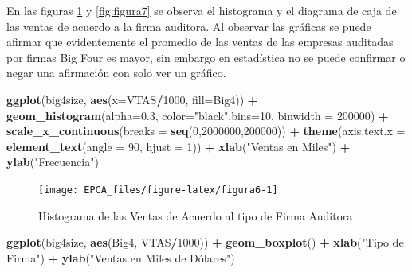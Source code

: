 \documentclass[
]{krantz}
\makeatletter
\newenvironment{Shaded}{\begin{snugshade}}{\end{snugshade}}
\newcommand{\DataTypeTok}[1]{\textcolor[rgb]{0.27,0.27,0.27}{#1}}
\newcommand{\DecValTok}[1]{\textcolor[rgb]{0.06,0.06,0.06}{#1}}
\newcommand{\FloatTok}[1]{\textcolor[rgb]{0.06,0.06,0.06}{#1}}
\newcommand{\KeywordTok}[1]{\textcolor[rgb]{0.27,0.27,0.27}{\textbf{#1}}}
\newcommand{\NormalTok}[1]{#1}
\newcommand{\OperatorTok}[1]{\textcolor[rgb]{0.43,0.43,0.43}{\textbf{#1}}}
\newcommand{\StringTok}[1]{\textcolor[rgb]{0.5,0.5,0.5}{#1}}
\newenvironment{kframe}{%
\medskip{}
\setlength{\fboxsep}{.8em}
 \def\at@end@of@kframe{}%
 \ifinner\ifhmode%
  \def\at@end@of@kframe{\end{minipage}}%
  \begin{minipage}{\columnwidth}%
 \fi\fi%
 \def\FrameCommand##1{\hskip\@totalleftmargin \hskip-\fboxsep
 \colorbox{shadecolor}{##1}\hskip-\fboxsep
     \hskip-\linewidth \hskip-\@totalleftmargin \hskip\columnwidth}%
 \MakeFramed {\advance\hsize-\width
   \@totalleftmargin\z@ \linewidth\hsize
   \@setminipage}}%
 {\par\unskip\endMakeFramed%
 \at@end@of@kframe}
\renewenvironment{Shaded}{\begin{kframe}}{\end{kframe}}
\makeatother
\begin{document}
En las figuras \ref{fig:figura6} y \ref{fig:figura7} se observa el histograma y el diagrama de caja de las ventas de acuerdo a la firma auditora. Al observar las gráficas se puede afirmar que evidentemente el promedio de las ventas de las empresas auditadas por firmas Big Four es mayor, sin embargo en estadística no se puede confirmar o negar una afirmación con solo ver un gráfico.

\begin{Shaded}
\begin{Highlighting}[]
\KeywordTok{ggplot}\NormalTok{(big4size, }\KeywordTok{aes}\NormalTok{(}\DataTypeTok{x=}\NormalTok{VTAS}\OperatorTok{/}\DecValTok{1000}\NormalTok{, }\DataTypeTok{fill=}\NormalTok{Big4)) }\OperatorTok{+}\StringTok{ }
\StringTok{  }\KeywordTok{geom_histogram}\NormalTok{(}\DataTypeTok{alpha=}\FloatTok{0.3}\NormalTok{, }\DataTypeTok{color=}\StringTok{"black"}\NormalTok{,}\DataTypeTok{bins=}\DecValTok{10}\NormalTok{, }\DataTypeTok{binwidth =} \DecValTok{200000}\NormalTok{) }\OperatorTok{+}
\StringTok{  }\KeywordTok{scale_x_continuous}\NormalTok{(}\DataTypeTok{breaks =} \KeywordTok{seq}\NormalTok{(}\DecValTok{0}\NormalTok{,}\DecValTok{2000000}\NormalTok{,}\DecValTok{200000}\NormalTok{)) }\OperatorTok{+}
\StringTok{  }\KeywordTok{theme}\NormalTok{(}\DataTypeTok{axis.text.x =} \KeywordTok{element_text}\NormalTok{(}\DataTypeTok{angle =} \DecValTok{90}\NormalTok{, }\DataTypeTok{hjust =} \DecValTok{1}\NormalTok{)) }\OperatorTok{+}
\StringTok{  }\KeywordTok{xlab}\NormalTok{(}\StringTok{"Ventas en Miles"}\NormalTok{) }\OperatorTok{+}\StringTok{ }\KeywordTok{ylab}\NormalTok{(}\StringTok{"Frecuencia"}\NormalTok{) }
\end{Highlighting}
\end{Shaded}

\begin{figure}[h!]

{\centering \texttt{[image: EPCA\_files/figure-latex/figura6-1]} 

}

\caption{Histograma de las Ventas de Acuerdo al tipo de Firma Auditora}\label{fig:figura6}
\end{figure}

\begin{Shaded}
\begin{Highlighting}[]
\KeywordTok{ggplot}\NormalTok{(big4size, }\KeywordTok{aes}\NormalTok{(Big4, VTAS}\OperatorTok{/}\DecValTok{1000}\NormalTok{)) }\OperatorTok{+}\StringTok{ }
\StringTok{  }\KeywordTok{geom_boxplot}\NormalTok{() }\OperatorTok{+}\StringTok{ }\KeywordTok{xlab}\NormalTok{(}\StringTok{"Tipo de Firma"}\NormalTok{) }\OperatorTok{+}
\StringTok{  }\KeywordTok{ylab}\NormalTok{(}\StringTok{"Ventas en Miles de Dólares")}
\end{Highlighting}
\end{Shaded}
\end{document}
